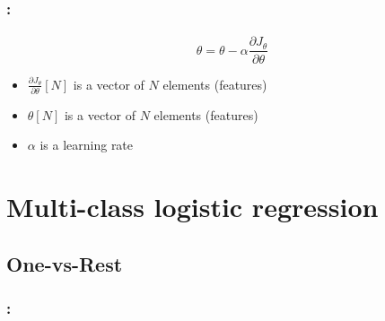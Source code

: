 \documentclass[xcolor=table]{beamer}
\begin{document}
\begin{frame}
	\frametitle{\insertshortsubtitle: \insertsection}
	\framesubtitle{\insertsubsection}

	\[\theta = \theta - \alpha \frac{\partial J_\theta}{\partial \theta}\]
	
	\begin{itemize}
		\item $\frac{\partial J_\theta}{\partial \theta}[N]$ is a vector of $N$ elements (features)
		\item $\theta[N]$ is a vector of $N$ elements (features)
		\item $\alpha $ is a learning rate
	\end{itemize}
	
\end{frame}

\section{Multi-class logistic regression}

\begin{frame}
	\frametitle{\insertshortsubtitle}
	\framesubtitle{\insertsection}
	
	
\end{frame}

\subsection{One-vs-Rest}

\begin{frame}
	\frametitle{\insertshortsubtitle: \insertsection}
	\framesubtitle{\insertsubsection}
	
	\begin{center}
	\end{center}
	
\end{frame}
\end{document}
